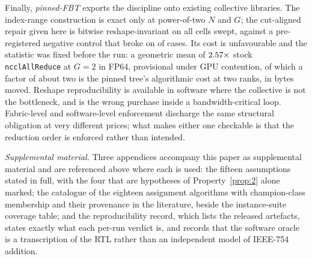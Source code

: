 \documentclass[journal,10pt]{IEEEtran}
\theoremstyle{plain}
\theoremstyle{definition}
\theoremstyle{remark}
\begin{document}
Finally, \emph{pinned-FBT} exports the discipline onto existing collective
libraries. The index-range construction is exact only at power-of-two $N$ and
$G$; the cut-aligned repair given here is bitwise reshape-invariant on all
\PinCells{} cells swept, against a pre-registered negative control that broke
on \PinNegFired{} of \PinNegCases{} cases. Its cost is unfavourable and the
statistic was fixed before the run: a geometric mean of $2.57\times$
stock \texttt{ncclAllReduce} at $G{=}2$ in FP64, provisional under GPU
contention, of which a factor of about two is the pinned tree's algorithmic
cost at two ranks, in bytes moved. Reshape reproducibility is available in
software where the collective is not the bottleneck, and is the wrong purchase
inside a bandwidth-critical loop. Fabric-level and software-level enforcement
discharge the same structural obligation at very different prices; what makes
either one checkable is that the reduction order is enforced rather than
intended.



\emph{Supplemental material.} Three appendices accompany this paper as
supplemental material and are referenced above where each is used: the
fifteen assumptions stated in full, with the four that are hypotheses of
Property~\ref{prop:2} alone marked; the catalogue of the eighteen assignment
algorithms with champion-class membership and their provenance in the
literature, beside the instance-suite coverage table; and the
reproducibility record, which lists the released artefacts, states exactly
what each per-run verdict is, and records that the software oracle is a
transcription of the RTL rather than an independent model of IEEE-754
addition.



\end{document}
